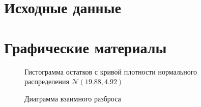 
\newpage

\appendix

\section{ Исходные данные}
\label{c:source_data}


\newpage
\section{ Графические материалы}
\label{c:graphs}

\setcounter{figure}{0}

\begin{figure}[H]
\caption{Гистограмма остатков с кривой плотности нормального распределения $\mathcal{N}(19.88, 4.92)$}
\label{img:resid_hist}
\end{figure}

\begin{figure}[H]
\caption{Диаграмма взаимного разброса}
\label{img:hscat}
\end{figure}

